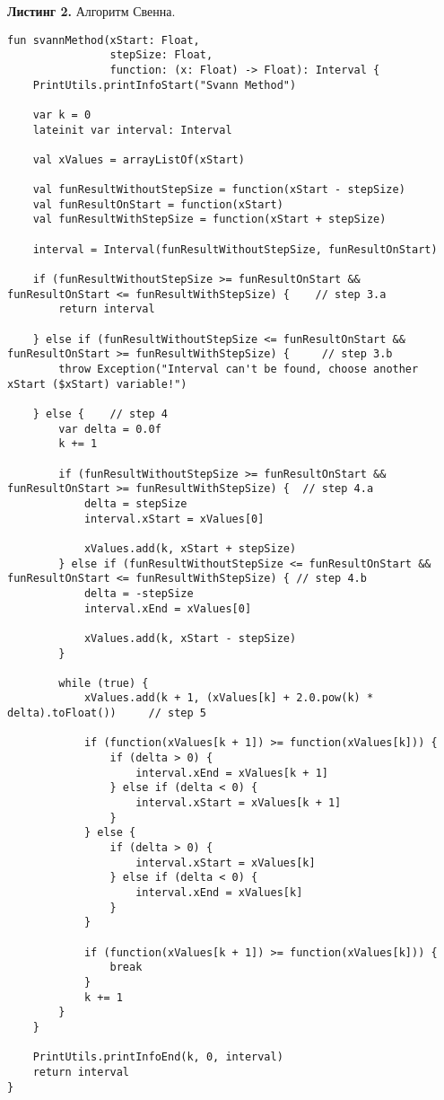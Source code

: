 \documentclass[a4paper, 12pt]{article}   	%
\begin{document}
    \textbf{Листинг 2.} Алгоритм Свенна.
    \begin{verbatim}
fun svannMethod(xStart: Float,
                stepSize: Float,
                function: (x: Float) -> Float): Interval {
    PrintUtils.printInfoStart("Svann Method")

    var k = 0
    lateinit var interval: Interval

    val xValues = arrayListOf(xStart)

    val funResultWithoutStepSize = function(xStart - stepSize)
    val funResultOnStart = function(xStart)
    val funResultWithStepSize = function(xStart + stepSize)

    interval = Interval(funResultWithoutStepSize, funResultOnStart)

    if (funResultWithoutStepSize >= funResultOnStart && funResultOnStart <= funResultWithStepSize) {    // step 3.a
        return interval

    } else if (funResultWithoutStepSize <= funResultOnStart && funResultOnStart >= funResultWithStepSize) {     // step 3.b
        throw Exception("Interval can't be found, choose another xStart ($xStart) variable!")

    } else {    // step 4
        var delta = 0.0f
        k += 1

        if (funResultWithoutStepSize >= funResultOnStart && funResultOnStart >= funResultWithStepSize) {  // step 4.a
            delta = stepSize
            interval.xStart = xValues[0]

            xValues.add(k, xStart + stepSize)
        } else if (funResultWithoutStepSize <= funResultOnStart && funResultOnStart <= funResultWithStepSize) { // step 4.b
            delta = -stepSize
            interval.xEnd = xValues[0]

            xValues.add(k, xStart - stepSize)
        }

        while (true) {
            xValues.add(k + 1, (xValues[k] + 2.0.pow(k) * delta).toFloat())     // step 5

            if (function(xValues[k + 1]) >= function(xValues[k])) {
                if (delta > 0) {
                    interval.xEnd = xValues[k + 1]
                } else if (delta < 0) {
                    interval.xStart = xValues[k + 1]
                }
            } else {
                if (delta > 0) {
                    interval.xStart = xValues[k]
                } else if (delta < 0) {
                    interval.xEnd = xValues[k]
                }
            }

            if (function(xValues[k + 1]) >= function(xValues[k])) {
                break
            }
            k += 1
        }
    }

    PrintUtils.printInfoEnd(k, 0, interval)
    return interval
}
    \end{verbatim}
\end{document}
